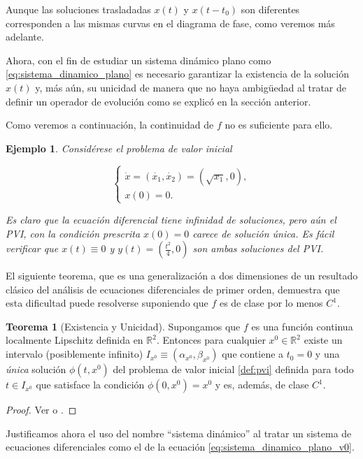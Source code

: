 \documentclass[11pt]{book}
\theoremstyle{definition}
\numberwithin{definition}{section}
\theoremstyle{theorem}
\newtheorem{theorem}{Teorema}
\numberwithin{theorem}{section}
\numberwithin{lemma}{section}
\numberwithin{corollary}{section}
\theoremstyle{plain}
\newtheorem{example}{Ejemplo}
\numberwithin{example}{section}
\newcommand{\R}{{\ensuremath{\mathbb{R}}}}
\begin{document}
Aunque las soluciones trasladadas $x(t)$ y $x(t-t_0)$ son diferentes corresponden a las mismas curvas en el diagrama de fase, como veremos más adelante.

Ahora, con el fin de estudiar un sistema dinámico plano como \ref{eq:sistema_dinamico_plano} es necesario garantizar la existencia de la solución $x(t)$ y, más aún, su unicidad de manera que no haya ambigüedad al tratar de definir un operador de evolución como se explicó en la sección anterior.

Como veremos a continuación, la continuidad de $f$ no es suficiente para ello.

\begin{example}Considérese el problema de valor inicial
    
$$
\left\{
    \begin{array}{l}
        \dot{x} = (\dot{x_1}, \dot{x_2}) = (\sqrt{x_1}, 0), \\
        x(0) = 0.
    \end{array}
\right.
$$

Es claro que la ecuación diferencial tiene infinidad de soluciones, pero aún el PVI, con la condición prescrita $x(0) = 0$ carece de solución única. Es fácil verificar que $x(t) \equiv 0$ y $y(t) = (\frac{t^2}{4}, 0) $ son ambas soluciones del PVI.
\end{example}

El siguiente teorema, que es una generalización a dos dimensiones de un resultado clásico del análisis de ecuaciones diferenciales de primer orden, demuestra que esta dificultad puede resolverse suponiendo que $f$ es de clase por lo menos $C^1$.

\begin{theorem}[Existencia y Unicidad] \label{teo:existenciayunicidad} Supongamos que $f$ es una función continua localmente Lipschitz definida en $\R^2$. Entonces para cualquier $x^0 \in \R^2$ existe un intervalo (posiblemente infinito) $I_{x^0} \equiv (\alpha_{x^0}, \beta_{x^0})$ que contiene a $t_0 = 0$ y una \emph{única} solución $\phi(t,x^0)$ del problema de valor inicial \ref{def:pvi} definida para todo $t \in I_{x^0}$ que satisface la condición $\phi(0, x^0) = x^0$ y es, además, de clase $C^1$.
\begin{proof}
Ver \cite[p.~10]{barrvalls} o \cite[p.~163]{smale}.
\end{proof}
\end{theorem}

Justificamos ahora el uso del nombre ``sistema dinámico'' al tratar un sistema de ecuaciones diferenciales como el de la ecuación \ref{eq:sistema_dinamico_plano_v0}.
\end{document}
